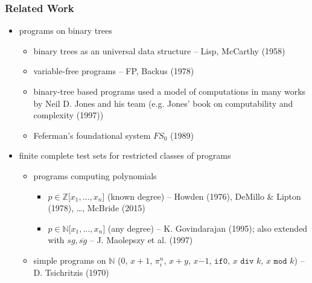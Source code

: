 \documentclass{beamer}
\begin{document}
\begin{frame}
  \frametitle{Related Work}
  \begin{itemize}
    \item programs on binary trees
	  \begin{itemize}
	    \item binary trees as an universal data structure -- Lisp, McCarthy (1958)
	    \item variable-free programs -- FP, Backus (1978)
	    \item binary-tree based programs used a model of computations in 
	      many works by Neil D. Jones and his team (e.g. Jones' book 
	      on computability and complexity (1997))
	    \item Feferman's foundational system $FS_0$ (1989)
	  \end{itemize}
	\item finite complete test sets for restricted classes of programs
	  \begin{itemize}
	    \item programs computing polynomials
	      \begin{itemize}
	        \item $p \in \mathbb{Z}\lbrack x_1, \ldots, x_n\rbrack$ (known degree) --
	          Howden (1976), DeMillo \& Lipton (1978), \ldots, McBride (2015)
	        \item $p \in \mathbb{N}\lbrack x_1, \ldots, x_n\rbrack$ (any degree) --
	          K. Govindarajan (1995); 
	          also extended with $\mathit{sg}, \overline{\mathit{sg}}$ --
	          J. Maolepszy et al. (1997)
	      \end{itemize}
	    \item simple programs on $\mathbb{N}$ 
	      ($0$, $x+1$, $\pi^n_i$, $x+y$, $x\dot{-}1$, $\texttt{if0}$, $x \texttt{ div } k$, $x \texttt{ mod } k$)
	      -- D. Tsichritzis (1970)
	  \end{itemize}
  \end{itemize}
\end{frame}
\end{document}
